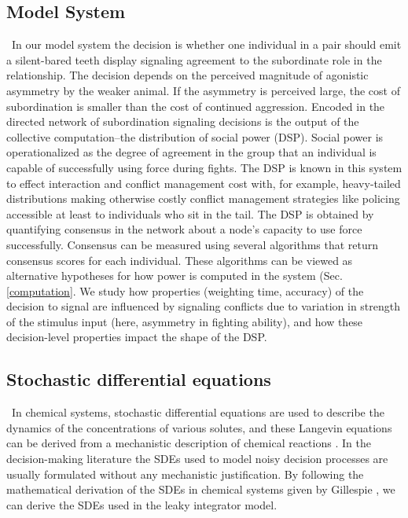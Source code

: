 \documentclass{article}
\begin{document}
\subsection*{Model System }
\ In our model system the decision is whether one individual in a pair should emit a silent-bared teeth display signaling agreement to the subordinate role in the relationship. The decision depends on the perceived magnitude of agonistic asymmetry by the weaker animal. If the asymmetry is perceived large, the cost of subordination is smaller than the cost of continued aggression. Encoded in the directed network of subordination signaling decisions is the output of the collective computation--the distribution of social power (DSP). Social power is operationalized as the degree of agreement in the group that an individual is capable of successfully using force during fights. The DSP is known in this system to effect interaction and conflict management cost with, for example, heavy-tailed distributions making otherwise costly conflict management strategies like policing accessible at least to individuals who sit in the tail. The DSP is obtained by quantifying consensus in the network about a node's capacity to use force successfully. Consensus can be measured using several algorithms that return consensus scores for each individual. These algorithms can be viewed as alternative hypotheses for how power is computed in the system (Sec.\ref{computation}. We study how properties (weighting time, accuracy) of the decision to signal are influenced by signaling conflicts due to variation in strength of the stimulus input (here, asymmetry in fighting ability), and how these decision-level properties impact the shape of the DSP. 

\subsection*{Stochastic differential equations }    
\ In chemical systems, stochastic differential equations are used to describe the dynamics of the concentrations of various solutes, and these Langevin equations can be derived from a mechanistic description of chemical reactions \cite{Gillespie:1992vn,Gillespie:2000fk}. In the decision-making literature the SDEs used to model noisy decision processes are usually formulated without any mechanistic justification. By following the mathematical derivation of the SDEs in chemical systems given by Gillespie \cite{Gillespie:2000fk},  we can derive the SDEs used in the leaky integrator model.
\end{document}
